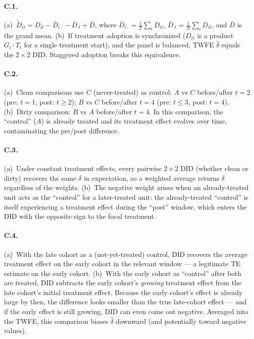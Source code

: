 \documentclass{article}
\begin{document}
\bigskip

\paragraph{C.1.}  (a)~$\tilde D_{it} = D_{it} - \bar D_{i\cdot} - \bar D_{\cdot t} + \bar D$, where $\bar D_{i\cdot} = \frac{1}{T}\sum_t D_{it}$, $\bar D_{\cdot t} = \frac{1}{N}\sum_i D_{it}$, and $\bar D$ is the grand mean.  (b)~If treatment adoption is synchronized ($D_{it}$ is a product $G_i\cdot T_t$ for a single treatment start), and the panel is balanced, TWFE $\hat\delta$ equals the $2\times 2$ DID.  Staggered adoption breaks this equivalence.

\paragraph{C.2.}  (a)~Clean comparisons use $C$ (never-treated) as control: $A$ vs $C$ before/after $t = 2$ (pre: $t = 1$, post: $t \geq 2$); $B$ vs $C$ before/after $t = 4$ (pre: $t \leq 3$, post: $t = 4$).  (b)~Dirty comparison: $B$ vs $A$ before/after $t = 4$.  In this comparison, the ``control'' ($A$) is already treated and its treatment effect evolves over time, contaminating the pre/post difference.

\paragraph{C.3.}  (a)~Under constant treatment effects, every pairwise $2\times 2$ DID (whether clean or dirty) recovers the same $\delta$ in expectation, so a weighted average returns $\delta$ regardless of the weights.  (b)~The negative weight arises when an already-treated unit acts as the ``control'' for a later-treated unit: the already-treated ``control'' is itself experiencing a treatment effect during the ``post'' window, which enters the DID with the opposite sign to the focal treatment.

\paragraph{C.4.}  (a)~With the late cohort as a (not-yet-treated) control, DID recovers the average treatment effect on the early cohort in the relevant window --- a legitimate TE estimate on the early cohort.  (b)~With the early cohort as ``control'' after both are treated, DID subtracts the early cohort's \emph{growing} treatment effect from the late cohort's initial treatment effect.  Because the early cohort's effect is already large by then, the difference looks smaller than the true late-cohort effect --- and if the early effect is still growing, DID can even come out negative.  Averaged into the TWFE, this comparison biases $\hat\delta$ downward (and potentially toward negative values).
\end{document}
